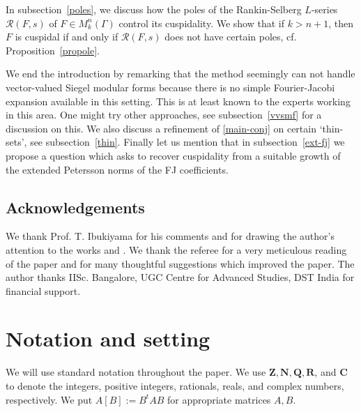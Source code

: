 \documentclass[12pt]{amsart}
\numberwithin{equation}{section}
\theoremstyle{plain}
\newcommand{\propref}[1]{Proposition~\ref{#1}}
\theoremstyle{definition}
\newcommand*{\complex}{\mathbf{C}}
\newcommand*{\Q}{\mathbf{Q}}
\newcommand{\z}{\mf Z}
\newcommand{\mf}{\mathbf}
\newcommand{\mc}{\mathcal}
\newcommand{\mrm}{\mathrm}
\newcommand{\spn}{\mrm{Sp}_n(\mf Z)}
\newcommand{\mkngam}{M^n_k(\Gamma)}
\begin{document}
In subsection~\ref{poles}, we discuss how the poles of the Rankin-Selberg $L$-series $\mc R(F,s)$ of $F \in \mkngam$ control its cuspidality. We show that if $k>n+1$, then $F$ is cuspidal if and only if $\mc R(F,s)$ does not have certain poles, cf. \propref{propole}. 

We end the introduction by remarking that the method seemingly can not handle vector-valued Siegel modular forms because there is no simple Fourier-Jacobi expansion available in this setting. This is at least known to the experts working in this area. One might try other approaches, see subsection~\ref{vvsmf} for a discussion on this.  We also discuss a refinement of \ref{main-conj} on certain `thin-sets', see subsection~\ref{thin}. Finally let us mention that in subsection~\ref{ext-fj} we propose a question which asks to recover cuspidality from a suitable growth of the extended Petersson norms of the FJ coefficients.

\subsection*{Acknowledgements}
{\small
We thank Prof. T. Ibukiyama for his comments and for drawing the author's attention to the works \cite{Ibu-SK} and \cite{ibu-formal}.
We thank the referee for a very meticulous reading of the paper and for many thoughtful suggestions which improved the paper.
The author thanks IISc. Bangalore, UGC Centre for Advanced Studies, DST India for financial support.
}

\section{Notation and setting} \label{prelim}
We will use standard notation throughout the paper. We use $\z, \mf N, \Q, \mf R$, and $\complex$ to denote the integers, positive integers, 
rationals, reals, and complex numbers, respectively. We put $A[B]:=B^tAB$ for appropriate matrices $A,B$.

\end{document}
